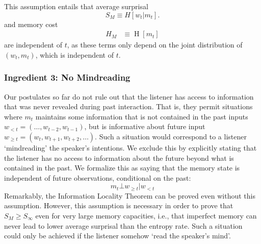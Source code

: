 \documentclass[11pt,letterpaper]{article}
\begin{document}
This assumption entails that average surprisal
\begin{equation}
    S_M \equiv H[w_t | m_t].
\end{equation}
and memory cost
\begin{align}
    \label{eq:memory-entropy}
        H_M &\equiv \operatorname{H}[m_t] 
\end{align}
are independent of $t$, as these terms only depend on the joint distribution of $(w_t, m_t)$, which is independent of $t$.

\subsubsection{Ingredient 3: No Mindreading}



Our postulates so far do not rule out that the listener has access to information that was never revealed during past interaction.
That is, they permit situations where $m_t$ maintains some information that is not contained in the past inputs $w_{<t} = (\dots, w_{t-2}, w_{t-1})$, but is informative about future input $w_{\geq t} = (w_{t}, w_{t+1}, w_{t+2}, \dots)$. 
Such a situation would correspond to a listener `mindreading' the speaker's intentions.
We exclude this by explicitly stating that the listener has no access to information about the future beyond what is contained in the past.
We formalize this as saying that the memory state is independent of future observations, conditional on the past:
\begin{equation}\label{eq:no-mindreading}
    m_t \bot w_{\geq t} | w_{<t}
\end{equation}
Remarkably, the Information Locality Theorem can be proved even without this assumption.
However, this assumption is necessary in order to prove that $S_M \geq S_\infty$ even for very large memory capacities, i.e., that imperfect memory can never lead to lower average surprisal than the entropy rate. Such a situation could only be achieved if the listener somehow `read the speaker's mind'.
\end{document}
